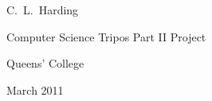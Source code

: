 \thispagestyle{empty}

\begin{flushright}
    {\Large C.~L.~Harding}
\end{flushright}

\bigskip

\begingroup
    \thispagestyle{empty}
    \let\clearpage\relax
    \let\cleardoublepage\relax
    \let\cleardoublepage\relax
    \thispagestyle{empty}
    
    \vspace{12em}
    \vspace{4em}
    
    \large
    
    \noindent Computer Science Tripos Part II Project
    \vspace{1em}

    \noindent Queens' College
    \vspace{1em}
    
    \noindent March 2011
    \vspace{1em}
    
    \thispagestyle{empty}
\endgroup